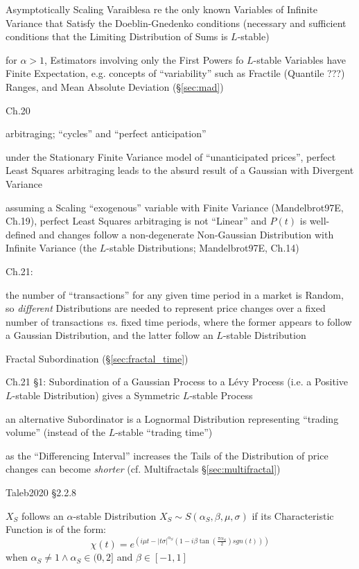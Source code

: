 Asymptotically Scaling Varaiblesa re the only known Variables of Infinite
Variance that Satisfy the Doeblin-Gnedenko conditions (necessary and sufficient
conditions that the Limiting Distribution of Sums is $L$-stable)

for $\alpha > 1$, Estimators involving only the First Powers fo $L$-stable
Variables have Finite Expectation, e.g. concepts of ``variability'' such as
Fractile (Quantile ???) Ranges, and Mean Absolute Deviation (\S\ref{sec:mad})

Ch.20

arbitraging; ``cycles'' and ``perfect anticipation''

under the Stationary Finite Variance model of ``unanticipated prices'', perfect
Least Squares arbitraging leads to the absurd result of a Gaussian with
Divergent Variance

assuming a Scaling ``exogenous'' variable with Finite Variance (Mandelbrot97E,
Ch.19), perfect Least Squares arbitraging is not ``Linear'' and $P(t)$ is
well-defined and changes follow a non-degenerate Non-Gaussian Distribution with
Infinite Variance (the $L$-stable Distributions; Mandelbrot97E, Ch.14)

Ch.21:

the number of ``transactions'' for any given time period in a market is Random,
so \emph{different} Distributions are needed to represent price changes over a
fixed number of transactions \emph{vs.} fixed time periods, where the former
appears to follow a Gaussian Distribution, and the latter follow an $L$-stable
Distribution

Fractal Subordination (\S\ref{sec:fractal_time})

Ch.21 \S 1: Subordination of a Gaussian Process to a L\'evy Process (i.e. a
Positive $L$-stable Distribution) gives a Symmetric $L$-stable Process

an alternative Subordinator is a Lognormal Distribution representing ``trading
volume'' (instead of the $L$-stable ``trading time'')

as the ``Differencing Interval'' increases the Tails of the Distribution of
price changes can become \emph{shorter} (cf. Multifractals
\S\ref{sec:multifractal})

\asterism

Taleb2020 \S 2.2.8

$X_S$ follows an $\alpha$-stable Distribution
$X_S \sim S(\alpha_S, \beta, \mu, \sigma)$ if its Characteristic Function is of
the form:
\[
  \chi(t) =
    e^{(i\mu t
      - |t\sigma|^{\alpha_S} (1 - i\beta \tan(\frac{\pi\alpha_S}{2}) sgn(t))
    )}
\]
when $\alpha_S \neq 1 \wedge \alpha_S \in (0, 2]$ and $\beta \in [-1, 1]$

